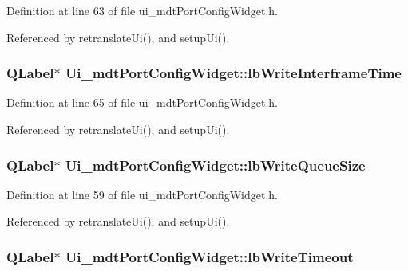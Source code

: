 Definition at line 63 of file ui\-\_\-mdt\-Port\-Config\-Widget.\-h.



Referenced by retranslate\-Ui(), and setup\-Ui().

\hypertarget{class_ui__mdt_port_config_widget_ab8640cb5cf95125b496bfbbaff548564}{
\subsubsection[{lb\-Write\-Interframe\-Time}]{\setlength{\rightskip}{0pt plus 5cm}Q\-Label$\ast$ Ui\-\_\-mdt\-Port\-Config\-Widget\-::lb\-Write\-Interframe\-Time}}\label{class_ui__mdt_port_config_widget_ab8640cb5cf95125b496bfbbaff548564}


Definition at line 65 of file ui\-\_\-mdt\-Port\-Config\-Widget.\-h.



Referenced by retranslate\-Ui(), and setup\-Ui().

\hypertarget{class_ui__mdt_port_config_widget_a7f57346f1e11a863d0b77664edf6a671}{
\subsubsection[{lb\-Write\-Queue\-Size}]{\setlength{\rightskip}{0pt plus 5cm}Q\-Label$\ast$ Ui\-\_\-mdt\-Port\-Config\-Widget\-::lb\-Write\-Queue\-Size}}\label{class_ui__mdt_port_config_widget_a7f57346f1e11a863d0b77664edf6a671}


Definition at line 59 of file ui\-\_\-mdt\-Port\-Config\-Widget.\-h.



Referenced by retranslate\-Ui(), and setup\-Ui().

\hypertarget{class_ui__mdt_port_config_widget_aa0a486c1023d9f7d4e133ae86a826cc7}{
\subsubsection[{lb\-Write\-Timeout}]{\setlength{\rightskip}{0pt plus 5cm}Q\-Label$\ast$ Ui\-\_\-mdt\-Port\-Config\-Widget\-::lb\-Write\-Timeout}}\label{class_ui__mdt_port_config_widget_aa0a486c1023d9f7d4e133ae86a826cc7}


